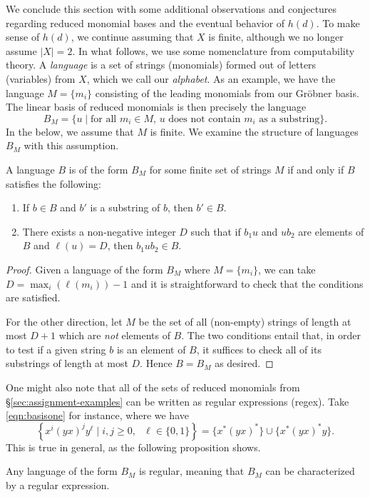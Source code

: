We conclude this section with some additional observations and conjectures regarding reduced monomial bases and the eventual behavior of $h(d)$. To make sense of $h(d)$, we continue assuming that $X$ is finite, although we no longer assume $|X| = 2$. In what follows, we use some nomenclature from computability theory. A \emph{language} is a set of strings (monomials) formed out of letters (variables) from $X$, which we call our \emph{alphabet}. As an example, we have the language $M = \{m_i\}$ consisting of the leading monomials from our Gr\"obner basis. The linear basis of reduced monomials is then precisely the language
\[
	B_M = \{u \mid \text{for all }m_i \in M\text{, }u \text{ does not contain }m_i\text{ as a substring}\}.
\]  
In the below, we assume that $M$ is finite. We examine the structure of languages $B_M$ with this assumption.
\begin{prop}\label{prop:BM-characterization}
	A language $B$ is of the form $B_M$ for some finite set of strings $M$ if and only if $B$ satisfies the following:
	\begin{enumerate}
		\item\label{item:substringcondition} If $b \in B$ and $b'$ is a substring of $b$, then $b' \in B$.
		\item\label{item:gluingcondition} There exists a non-negative integer $D$ such that if $b_1 u$ and $u b_2$ are elements of $B$ and $\ell(u) = D$, then $b_1 u b_2 \in B$.
	\end{enumerate}
\end{prop}
\begin{proof}
	Given a language of the form $B_M$ where $M=\{m_i\}$, we can take $D = \max_i(\ell(m_i))-1$ and it is straightforward to check that the conditions are satisfied.
	
	For the other direction, let $M$ be the set of all (non-empty) strings of length at most $D + 1$ which are \emph{not} elements of $B$. The two conditions entail that, in order to test if a given string $b$ is an element of $B$, it suffices to check all of its substrings of length at most $D$. Hence $B = B_M$ as desired.
\end{proof}
One might also note that all of the sets of reduced monomials from \S\ref{sec:assignment-examples} can be written as regular expressions (regex). Take \eqref{eqn:basisone} for instance, where we have 
\[
	\left\{x^i(yx)^jy^\ell\mid i,j\ge 0,\text{ }\ell\in\{0,1\}\right\} = \{ x^* (yx)^* \} \cup \{ x^* (yx)^* y \}.
\]
This is true in general, as the following proposition shows.
\begin{prop}
	Any language of the form $B_M$ is regular, meaning that $B_M$ can be characterized by a regular expression.
\end{prop}
